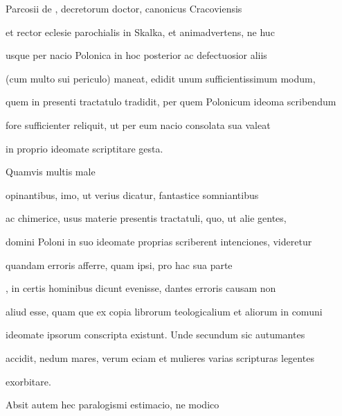 \begin{VerbatimLatin}[firstnumber=21]
Parcosii de , decretorum doctor, canonicus Cracoviensis

et rector eclesie parochialis in Skalka, et animadvertens, ne huc

usque per  nacio Polonica in hoc posterior ac defectuosior aliis

(cum multo sui periculo) maneat, edidit unum sufficientissimum modum,

quem in presenti tractatulo tradidit, per quem Polonicum ideoma scribendum

fore sufficienter reliquit, ut per eum nacio consolata sua valeat
\end{VerbatimLatin}


\renewcommand{\theFancyVerbLine}{\textcolor{green}{05-27\alph{FancyVerbLine}}}
\begin{VerbatimLatin}[firstnumber=1]
in proprio ideomate scriptitare gesta.

\indentP Quamvis multis male
\end{VerbatimLatin}
\renewcommand{\theFancyVerbLine}{05-\arabic{FancyVerbLine}\phantom{a}}

\begin{VerbatimLatin}[firstnumber=28]
opinantibus, imo, ut verius dicatur, fantastice somniantibus

ac chimerice, usus materie presentis tractatuli, quo, ut alie gentes,

domini Poloni in suo ideomate proprias scriberent intenciones, videretur 

 quandam erroris afferre, quam ipsi, pro hac sua parte 

, in certis hominibus dicunt evenisse, dantes erroris causam non

aliud esse, quam que ex copia librorum teologicalium et aliorum in comuni

ideomate ipsorum conscripta existunt. Unde secundum sic autumantes

accidit, nedum mares, verum eciam et mulieres varias scripturas legentes
\end{VerbatimLatin}
\renewcommand{\theFancyVerbLine}{\textcolor{green}{05-36\alph{FancyVerbLine}}}
\begin{VerbatimLatin}[firstnumber=1]
exorbitare.

\indentK Absit autem hec paralogismi estimacio, ne modico 
\end{VerbatimLatin}
\renewcommand{\theFancyVerbLine}{05-\arabic{FancyVerbLine}\phantom{a}}

